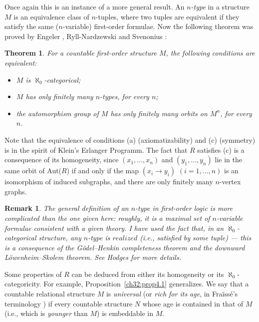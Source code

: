 \documentclass{book}
\newtheorem{theorem}{Theorem}
\newtheorem{remark}{Remark}
\begin{document}
Once again this is an instance of a more general result. An
\emph{$n$-type} in a structure $M$ is an equivalence class of
$n$-tuples, where two tuples are equivalent if they satisfy the same
($n$-variable) first-order formulae. Now the following theorem was
proved by Engeler \cite{ch32:bib16}, Ryll-Nardzewski
\cite{ch32:bib44} and Svenonius \cite{ch32:bib49}:

\begin{theorem}\label{ch32:them5.2} 
For a countable first-order structure $M$, the
following conditions are equivalent:
\begin{itemize}
\item[(a)] $M$ is $\aleph_0$-categorical;
\item[(b)] $M$ has only finitely many $n$-types, for every $n$;
\item[(c)] the automorphism group of $M$ has only finitely many orbits on $M^n$, for every
$n$.
\end{itemize}
\end{theorem}

Note that the equivalence of conditions (a) (axiomatizability) and
(c) (symmetry) is in the spirit of Klein's Erlanger Programm. The
fact that $R$ satisfies (c) is a consequence of its homogeneity,
since $(x_1,\ldots, x_n)$ and $(y_1,\ldots,y_n)$ lie in the same
orbit of Aut($R$) if and only if the map $(x_i \rightarrow y_i)$ $(i
= 1,\ldots, n)$ is an isomorphism of induced subgraphs, and there
are only finitely many $n$-vertex graphs.

\begin{remark}\label{ch32:rem5.1}\rm 
The general definition of an $n$-type in
first-order logic is more complicated than the one given here:
roughly, it is a maximal set of $n$-variable formulae consistent
with a given theory. I have used the fact that, in an
$\aleph_0$-categorical structure, any $n$-type is $realized$ (i.e.,
satisfied by some tuple) --- this is a consequence of the
G\"{o}del--Henkin completeness theorem and the downward
L\"{o}wenheim--Skolem theorem. See Hodges \cite{ch32:bib28} for more
details.
\end{remark}

Some properties of $R$ can be deduced from either its homogeneity or
its $\aleph_0$-categoricity. For example,
Proposition~\ref{ch32:prop4.1} generalizes. We say that a countable
relational structure $M$ is \emph{universal} (or \emph{rich for its
age}, in Fra\"{i}ss\'{e}'s terminology \cite{ch32:bib22}) if every
countable structure $N$ whose age is contained in that of $M$ (i.e.,
which is \emph{younger} than $M$) is embeddable in $M$.
\end{document}
